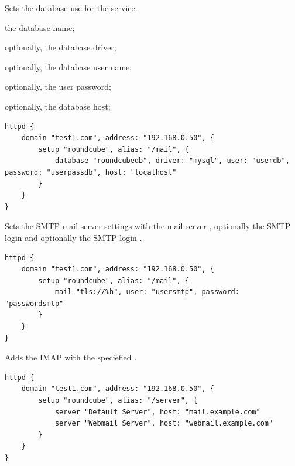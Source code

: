 Sets the database use for the service.
\begin{asparaitem}
\item {} the database name;
\item {} optionally, the database driver;
\item {} optionally, the database user name;
\item {} optionally, the user password;
\item {} optionally, the database host;
\end{asparaitem}

\begin{lstlisting}[style=Java]
httpd {
    domain "test1.com", address: "192.168.0.50", {
        setup "roundcube", alias: "/mail", {
            database "roundcubedb", driver: "mysql", user: "userdb", password: "userpassdb", host: "localhost"
        }
    }
}
\end{lstlisting}


Sets the SMTP mail server settings with the mail server , optionally 
the SMTP login  and optionally the SMTP login .

\begin{lstlisting}[style=Java]
httpd {
    domain "test1.com", address: "192.168.0.50", {
        setup "roundcube", alias: "/mail", {
            mail "tls://%h", user: "usersmtp", password: "passwordsmtp"
        }
    }
}
\end{lstlisting}


Adds the IMAP  with the speciefied .

\begin{lstlisting}[style=Java]
httpd {
    domain "test1.com", address: "192.168.0.50", {
        setup "roundcube", alias: "/server", {
            server "Default Server", host: "mail.example.com"
            server "Webmail Server", host: "webmail.example.com"
        }
    }
}
\end{lstlisting}


